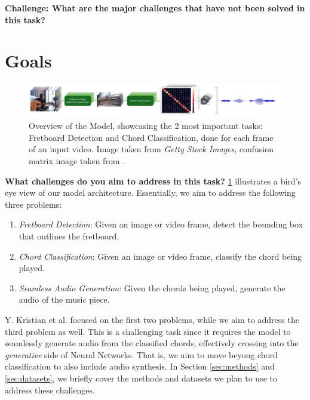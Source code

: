 \documentclass[10pt,twocolumn,letterpaper]{article}
\begin{document}
\textbf{Challenge: What are the major challenges that have not been solved in this task?}

\cite{Kristian_Zaman_Tenoyo_Jodhinata_2024}
\cite{du2023conditional}

\section{Goals}

\begin{figure}[h]
    \centering
    \includegraphics[width=\textwidth]{images/task-diagram.pdf}
    \caption{Overview of the Model, showcasing the 2 most important tasks: 
    Fretboard Detection and Chord Classification, done for each frame of an input video. Image taken from \textit{Getty Stock Images}, confusion matrix image taken from \cite{Kristian_Zaman_Tenoyo_Jodhinata_2024}.}
    \label{fig:model-diagram}
\end{figure}

\textbf{What challenges do you aim to address in this task?}
\cref{fig:model-diagram} illustrates a bird's eye view of our model architecture. Essentially, we aim to address the following three problems: 
\begin{enumerate}[label=\arabic*)]
    \item \emph{Fretboard Detection}: Given an image or video frame, detect the bounding box that outlines the fretboard.
    \item \emph{Chord Classification}: Given an image or video frame, classify the chord being played.
    \item \emph{Seamless Audio Generation}: Given the chords being played, generate the audio of the music piece.
\end{enumerate}
Y. Kristian et al. \cite{Kristian_Zaman_Tenoyo_Jodhinata_2024} focused on the first two problems, while we aim to address the third problem as well. This is a challenging task since it requires the model to seamlessly generate audio from the classified chords, effectively crossing into the \emph{generative} side of Neural Networks. That is, we aim to move beyong chord classification to also include audio synthesis. In Section \cref{sec:methods} and \cref{sec:datasets}, we briefly cover the methods and datasets we plan to use to address these challenges.
\end{document}
